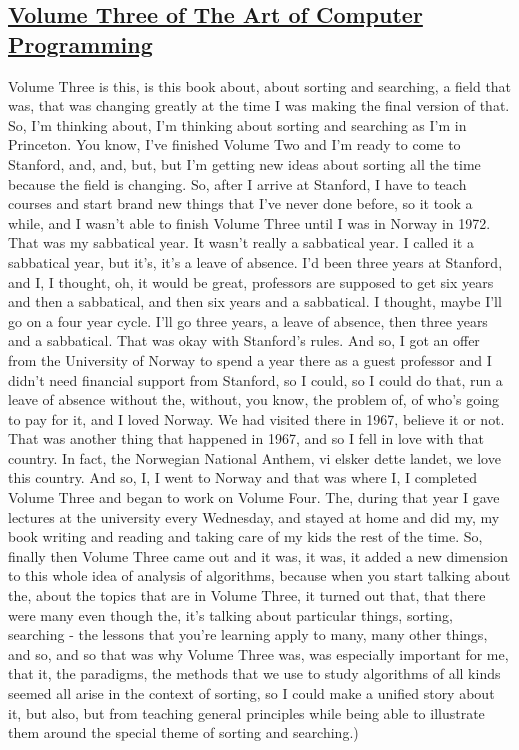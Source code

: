 \documentclass[]{article}
\begin{document}
\subsection{\texorpdfstring{\href{http://webofstories.com/play/17107}{Volume
Three of The Art of Computer
Programming}}{Volume Three of The Art of Computer Programming}}\label{volume-three-of-the-art-of-computer-programming}

Volume Three is this, is this book about, about sorting and searching, a
field that was, that was changing greatly at the time I was making the
final version of that. So, I'm thinking about, I'm thinking about
sorting and searching as I'm in Princeton. You know, I've finished
Volume Two and I'm ready to come to Stanford, and, and, but, but I'm
getting new ideas about sorting all the time because the field is
changing. So, after I arrive at Stanford, I have to teach courses and
start brand new things that I've never done before, so it took a while,
and I wasn't able to finish Volume Three until I was in Norway in 1972.
That was my sabbatical year. It wasn't really a sabbatical year. I
called it a sabbatical year, but it's, it's a leave of absence. I'd been
three years at Stanford, and I, I thought, oh, it would be great,
professors are supposed to get six years and then a sabbatical, and then
six years and a sabbatical. I thought, maybe I'll go on a four year
cycle. I'll go three years, a leave of absence, then three years and a
sabbatical. That was okay with Stanford's rules. And so, I got an offer
from the University of Norway to spend a year there as a guest professor
and I didn't need financial support from Stanford, so I could, so I
could do that, run a leave of absence without the, without, you know,
the problem of, of who's going to pay for it, and I loved Norway. We had
visited there in 1967, believe it or not. That was another thing that
happened in 1967, and so I fell in love with that country. In fact, the
Norwegian National Anthem, vi elsker dette landet, we love this country.
And so, I, I went to Norway and that was where I, I completed Volume
Three and began to work on Volume Four. The, during that year I gave
lectures at the university every Wednesday, and stayed at home and did
my, my book writing and reading and taking care of my kids the rest of
the time. So, finally then Volume Three came out and it was, it was, it
added a new dimension to this whole idea of analysis of algorithms,
because when you start talking about the, about the topics that are in
Volume Three, it turned out that, that there were many even though the,
it's talking about particular things, sorting, searching - the lessons
that you're learning apply to many, many other things, and so, and so
that was why Volume Three was, was especially important for me, that it,
the paradigms, the methods that we use to study algorithms of all kinds
seemed all arise in the context of sorting, so I could make a unified
story about it, but also, but from teaching general principles while
being able to illustrate them around the special theme of sorting and
searching.)
\end{document}
